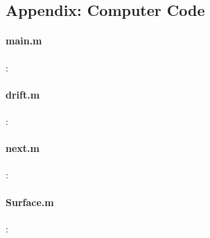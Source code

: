 \documentclass[12pt, letterpaper]{article}  %
\theoremstyle{definition}
\theoremstyle{remark}
\theoremstyle{plain}
\begin{document}




\newpage
\subsection*{Appendix: Computer Code}
\singlespacing
\paragraph{main.m}:

\paragraph{drift.m}:

\paragraph{next.m}:

\paragraph{Surface.m}:

\end{document}
